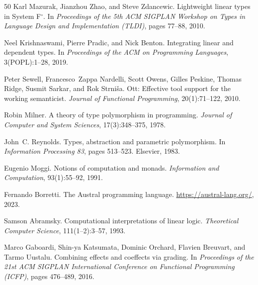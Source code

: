 \documentclass[11pt]{article}
\begin{document}
\begin{thebibliography}{50}
Karl Mazurak, Jianzhou Zhao, and Steve Zdancewic.
\newblock Lightweight linear types in {S}ystem {F}$^\circ$.
\newblock In \emph{Proceedings of the 5th ACM SIGPLAN Workshop on Types in Language Design and Implementation (TLDI)}, pages 77--88, 2010.

Neel Krishnaswami, Pierre Pradic, and Nick Benton.
\newblock Integrating linear and dependent types.
\newblock In \emph{Proceedings of the ACM on Programming Languages}, 3(POPL):1--28, 2019.

Peter Sewell, Francesco~Zappa Nardelli, Scott Owens, Gilles Peskine, Thomas Ridge, Susmit Sarkar, and Rok Strni\v{s}a.
\newblock Ott: Effective tool support for the working semanticist.
\newblock \emph{Journal of Functional Programming}, 20(1):71--122, 2010.

Robin Milner.
\newblock A theory of type polymorphism in programming.
\newblock \emph{Journal of Computer and System Sciences}, 17(3):348--375, 1978.

John~C. Reynolds.
\newblock Types, abstraction and parametric polymorphism.
\newblock In \emph{Information Processing 83}, pages 513--523. Elsevier, 1983.

Eugenio Moggi.
\newblock Notions of computation and monads.
\newblock \emph{Information and Computation}, 93(1):55--92, 1991.

Fernando Borretti.
\newblock The {A}ustral programming language.
\newblock \url{https://austral-lang.org/}, 2023.

Samson Abramsky.
\newblock Computational interpretations of linear logic.
\newblock \emph{Theoretical Computer Science}, 111(1--2):3--57, 1993.

Marco Gaboardi, Shin-ya Katsumata, Dominic Orchard, Flavien Breuvart, and Tarmo Uustalu.
\newblock Combining effects and coeffects via grading.
\newblock In \emph{Proceedings of the 21st ACM SIGPLAN International Conference on Functional Programming (ICFP)}, pages 476--489, 2016.

\end{thebibliography}

\appendix
\end{document}
